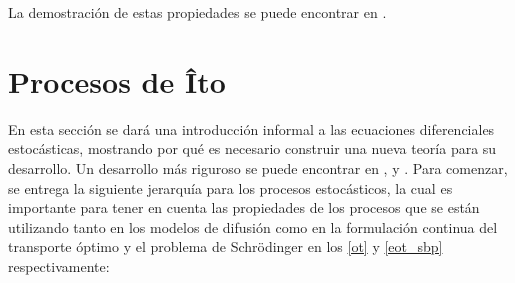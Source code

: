 
La demostración de estas propiedades se puede encontrar en \cite{Thorpe2018}.

\section{Procesos de Îto}
\label{sde}

En esta sección se dará una introducción informal a las ecuaciones diferenciales estocásticas, mostrando por qué es necesario construir una nueva teoría para su desarrollo. Un desarrollo más riguroso se puede encontrar en \cite{sarkkaSolin2019}, \cite{evans2013introduction} y \cite{karatzas1988brownian}. Para comenzar, se entrega la siguiente jerarquía para los procesos estocásticos, la cual es importante para tener en cuenta las propiedades de los procesos que se están utilizando tanto en los modelos de difusión como en la formulación continua del transporte óptimo y el problema de Schrödinger en los \autoref{ot} y \autoref{eot_sbp} respectivamente:

